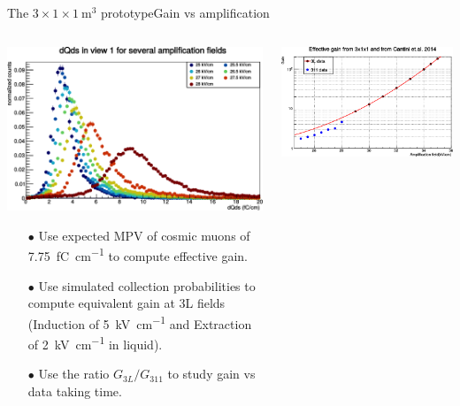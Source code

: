 \documentclass[10pt]{beamer}
\begin{document}
    \begin{frame}{The \texorpdfstring{$3 \times 1 \times \SI{1}{\meter\cubed}$}{311} prototype}{Gain vs amplification}
    	\begin{scriptsize}
	    	\begin{columns}
	    		\begin{column}{0.5\textwidth}
	    			\centering
	    			\includegraphics[width=\textwidth]{figures/311/dQds_gain.png}\\
	    			\vfill
	    			\begin{itemize}
	    				\item[$\bullet$] Use expected MPV of cosmic muons of \SI{7.75}{\femto\coulomb\per\centi\meter} to compute effective gain.
	    				\item[$\bullet$] Use simulated collection probabilities to compute equivalent gain at 3L fields (Induction of \SI{5}{\kilo\volt\per\centi\meter} and Extraction of \SI{2}{\kilo\volt\per\centi\meter} in liquid).
	    				\item[$\bullet$] Use the ratio $G_{3L}/G_{311}$ to study gain vs data taking time.
	    			\end{itemize}
	    		\end{column}
	    		\hfill
	    		\begin{column}{0.5\textwidth}
	    			\centering
	    			\includegraphics[width=.9025\textwidth]{figures/311/gain.png}\\

\end{column}
\end{columns}
\end{scriptsize}
\end{frame}
\end{document}
